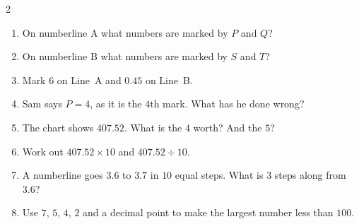 \documentclass{beamer}
\newcommand{\ashow}[1]{\uncover<2->{\textcolor{red}{\small #1}}}
\begin{document}
\begin{frame}
\begin{columns}[T]
\begin{multicols}{2}
\begin{enumerate}
  \item On numberline A what numbers are marked by  $P$ and $Q$? \ashow{$3$ and $8$}

  \item On numberline B what numbers are marked by  $S$ and $T$? \ashow{$0.3$ and $0.9$}

  \item Mark $6$ on Line~A and $0.45$ on Line~B.

  \item Sam says $P=4$, as it is the $4$th mark. What has he done wrong? \ashow{Counted marks, not steps: $P=3$}
  \columnbreak

  \item The chart shows $407.52$. What is the $4$ worth? And the $5$? \ashow{$400$ and $0.5$}


  \item Work out $407.52\times 10$ and $407.52\div 10$. \ashow{$4075.2$ and $40.752$}

  \item A numberline goes $3.6$ to $3.7$ in $10$ equal steps. What is $3$ steps along from $3.6$? \ashow{$3.63$}

  \item Use $7$, $5$, $4$, $2$ and a decimal point to make the largest number less than $100$. \ashow{$75.42$}

\end{enumerate}
\end{multicols}

\end{columns}

\end{frame}
\end{document}
